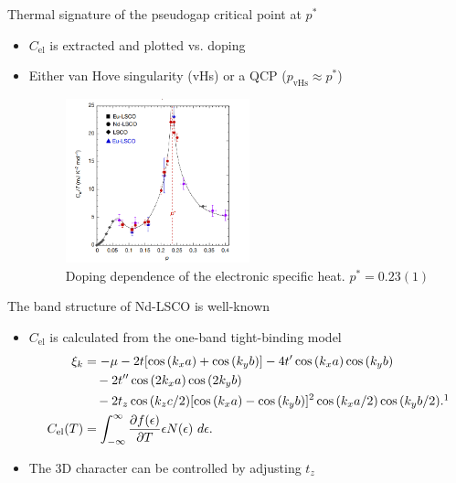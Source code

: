 \documentclass{beamer}
\begin{document}
\begin{frame}{Thermal signature of the pseudogap critical point at $p^{\ast}$}
\begin{itemize}
\item $C_{\text{el}}$ is extracted and plotted vs. doping
\item Either van Hove singularity (vHs) or a QCP ($p_{\text{vHs}} \approx p^{\ast}$\footnotemark)
\begin{figure}
\includegraphics[width=2.1in]{figs/c_el_p.png}
\caption*{Doping dependence of the electronic specific heat. $p^{\ast} = 0.23(1)$\footnotemark}
\end{figure}
\end{itemize}
\end{frame}

\begin{frame}{The band structure of Nd-LSCO is well-known}
\begin{itemize}
\item $C_{\text{el}}$ is calculated from the one-band tight-binding model
\footnotesize
\begin{align*}
\xi_k &= -\mu - 2t[\cos{(k_x a)} + \cos{(k_y b)}] - 4t^{\prime}\cos{(k_x a)}\cos{(k_y b)} \\
&~~~ -2t^{\prime\prime}\cos{(2k_x a)} \cos{(2k_y b)} \\
&~~~ -2t_z \cos{(k_z c / 2)}[\cos{(k_x a)} - \cos{(k_y b)}]^2 \cos{(k_x a / 2)} \cos{(k_y b / 2)}.\footnotemark \\
C_{\rm{el}}(T) &= \int_{-\infty}^{\infty} \frac{\partial f(\epsilon)}{\partial T} \epsilon N(\epsilon)~d\epsilon.
\end{align*}
\normalsize
\item The 3D character can be controlled by adjusting $t_z$
\end{itemize}
\end{frame}
\end{document}
